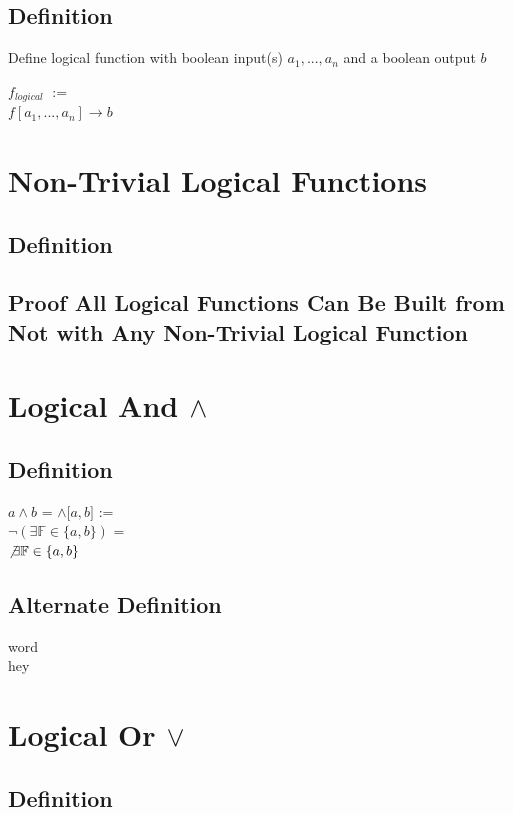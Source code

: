 \documentclass[11pt]{article}
\begin{document}
\subsection{Definition}
Define logical function with boolean input(s) $a_1,...,a_n$ and a boolean output $b$
\begin{center}
$f_{logical}$ $:=$\\
$f[a_1,...,a_n] \rightarrow b$
\end{center}




\section{Non-Trivial Logical Functions}
\subsection{Definition}
\subsection{Proof All Logical Functions Can Be Built from Not with Any Non-Trivial Logical Function}









\section{Logical And $\land$}
\subsection{Definition}
\begin{center}
$a \land b$ = $\land \lbrack a,b \rbrack$ :=\\
$\lnot (\exists \mathbb{F} \in \{a,b\})$ =\\
$\not \exists \mathbb{F} \in \{a,b\}$
\end{center}
\subsection{Alternate Definition}
word\\
hey

\section{Logical Or $\lor$}
\subsection{Definition}
\end{document}
